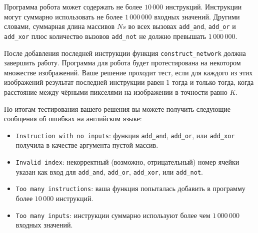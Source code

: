 Программа робота может содержать не более $10\,000$ инструкций. Инструкции
могут суммарно использовать не более $1\,000\,000$ входных значений. Другими
словами, суммарная длина массивов $Ns$ во всех вызовах \texttt{add\_and}, \texttt{add\_or} и \texttt{add\_xor} плюс количество вызовов \texttt{add\_not} не должно превышать $1\,000\,000$.

После добавления последней инструкции функция \texttt{construct\_network} должна
завершить работу. Программа для робота будет протестирована на некотором
множестве изображений. Ваше решение проходит тест, если для каждого из этих
изображений результат последней инструкции равен $1$ тогда и только тогда, когда
расстояние между чёрными пикселями на изображении в точности равно $K$.

По итогам тестирования вашего решения вы можете получить следующие
сообщения об ошибках на английском языке:

\begin{itemize}
\item \texttt{Instruction with no inputs}: функция  \texttt{add\_and}, \texttt{add\_or}, или \texttt{add\_xor} получила в качестве аргумента пустой массив.
\item \texttt{Invalid index}: некорректный (возможно, отрицательный) номер ячейки
указан как вход для \texttt{add\_and}, \texttt{add\_or}, \texttt{add\_xor}, или \texttt{add\_not}.
\item \texttt{Too many instructions}: ваша функция попыталась добавить в программу
более $10\,000$ инструкций.
\item \texttt{Too many inputs}: инструкции суммарно используют более чем $1\,000\,000$
входных значений.
\end{itemize}




